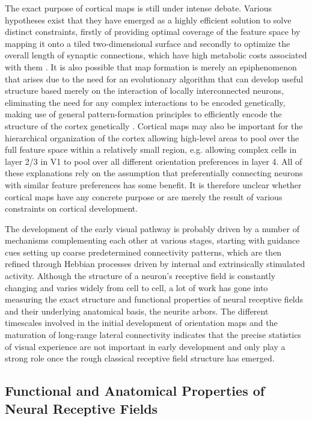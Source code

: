 The exact purpose of cortical maps is still under intense
debate. Various hypotheses exist that they have emerged as a highly
efficient solution to solve distinct constraints, firstly of providing
optimal coverage of the feature space by mapping it onto a tiled
two-dimensional surface and secondly to optimize the overall length of
synaptic connections, which have high metabolic costs associated with
them \cite{Koulakov2001}. It is also possible that map formation is
merely an epiphenomenon that arises due to the need for an
evolutionary algorithm that can develop useful structure based merely
on the interaction of locally interconnected neurons, eliminating the
need for any complex interactions to be encoded genetically, making
use of general pattern-formation principles to efficiently encode the
structure of the cortex genetically \citep{Wilson2015}. Cortical maps
may also be important for the hierarchical organization of the cortex
allowing high-level areas to pool over the full feature space within a
relatively small region, e.g. allowing complex cells in layer 2/3 in
V1 to pool over all different orientation preferences in layer 4. All
of these explanations rely on the assumption that preferentially
connecting neurons with similar feature preferences has some
benefit. It is therefore unclear whether cortical maps have any
concrete purpose or are merely the result of various constraints on
cortical development.

The development of the early visual pathway is probably driven by a
number of mechanisms complementing each other at various stages,
starting with guidance cues setting up coarse predetermined
connectivity patterns, which are then refined through Hebbian
processes driven by internal and extrinsically stimulated
activity. Although the structure of a neuron's receptive field is
constantly changing and varies widely from cell to cell, a lot of work
has gone into measuring the exact structure and functional properties
of neural receptive fields and their underlying anatomical basis, the
neurite arbors. The different timescales involved in the initial
development of orientation maps and the maturation of long-range
lateral connectivity indicates that the precise statistics of visual
experience are not important in early development and only play a
strong role once the rough classical receptive field structure has
emerged.

\subsection{Functional and Anatomical Properties of Neural Receptive Fields}


